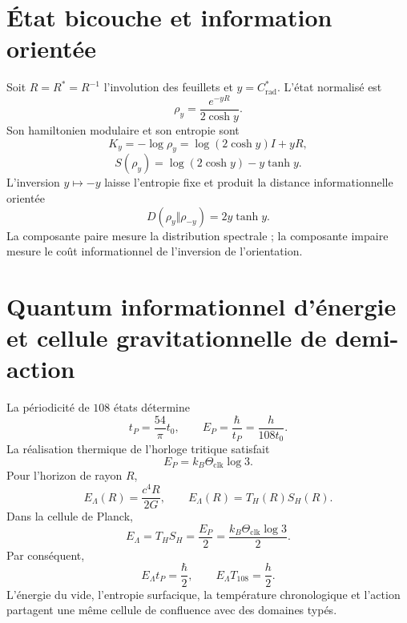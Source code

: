 \section{État bicouche et information orientée}
\label{sec:l9s102:estado-bicapa}

Soit \(R=R^*=R^{-1}\) l'involution des feuillets et
\(y=C^*_{\mathrm{rad}}\). L'état normalisé est
\begin{equation}
 \boxed{
 \rho_y=\frac{e^{-yR}}{2\cosh y}.}
 \label{eq:l9s102:rho-y}
\end{equation}
Son hamiltonien modulaire et son entropie sont
\begin{equation}
 K_y=-\log\rho_y=\log(2\cosh y)I+yR,
 \label{eq:l9s102:ky}
\end{equation}
\begin{equation}
 S(\rho_y)=\log(2\cosh y)-y\tanh y.
 \label{eq:l9s102:entropia-y}
\end{equation}
L'inversion \(y\mapsto-y\) laisse l'entropie fixe et produit la distance
informationnelle orientée
\begin{equation}
 \boxed{
 D(\rho_y\Vert\rho_{-y})=2y\tanh y.}
 \label{eq:l9s102:entropia-relativa-hojas}
\end{equation}
La composante paire mesure la distribution spectrale ; la composante impaire mesure
le coût informationnel de l'inversion de l'orientation.

\section{Quantum informationnel d'énergie et cellule gravitationnelle de demi-action}
\label{sec:l9s102:horizonte-media-accion}

La périodicité de \(108\) états détermine
\begin{equation}
 t_P=\frac{54}{\pi}t_0,
 \qquad
 E_P=\frac{\hbar}{t_P}=\frac{h}{108t_0}.
 \label{eq:l9s102:ep-tp}
\end{equation}
La réalisation thermique de l'horloge tritique satisfait
\begin{equation}
 \boxed{
 E_P=k_B\Theta_{\mathrm{clk}}\log3.}
 \label{eq:l9s102:planck-trit}
\end{equation}
Pour l'horizon de rayon \(R\),
\begin{equation}
 E_\Lambda(R)=\frac{c^4R}{2G},
 \qquad
 E_\Lambda(R)=T_H(R)S_H(R).
 \label{eq:l9s102:energia-horizonte}
\end{equation}
Dans la cellule de Planck,
\begin{equation}
 \boxed{
 E_\Lambda
 =T_HS_H
 =\frac{E_P}{2}
 =\frac{k_B\Theta_{\mathrm{clk}}\log3}{2}.}
 \label{eq:l9s102:confluencia-horizonte}
\end{equation}
Par conséquent,
\begin{equation}
 \boxed{
 E_\Lambda t_P=\frac{\hbar}{2},
 \qquad
 E_\Lambda T_{108}=\frac h2.}
 \label{eq:l9s102:media-accion}
\end{equation}
L'énergie du vide, l'entropie surfacique, la température chronologique et
l'action partagent une même cellule de confluence avec des domaines typés.


